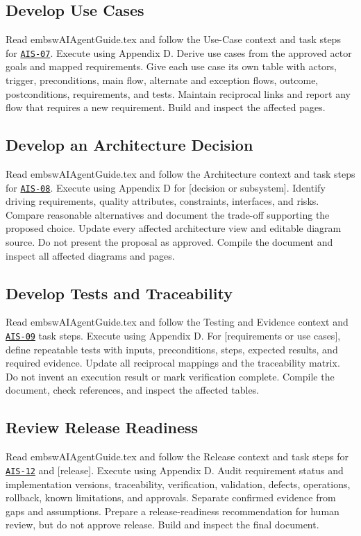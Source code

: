 \subsection{Develop Use Cases}
\begingroup\ttfamily\raggedright
\noindent Read embswAIAgentGuide.tex and follow the Use-Case context and task steps for \hyperref[Skill:AIS-07]{\texttt{AIS-07}}. Execute using Appendix D. Derive use cases from the approved actor goals and mapped requirements. Give each use case its own table with actors, trigger, preconditions, main flow, alternate and exception flows, outcome, postconditions, requirements, and tests. Maintain reciprocal links and report any flow that requires a new requirement. Build and inspect the affected pages.\par
\endgroup


\subsection{Develop an Architecture Decision}
\begingroup\ttfamily\raggedright
\noindent Read embswAIAgentGuide.tex and follow the Architecture context and task steps for \hyperref[Skill:AIS-08]{\texttt{AIS-08}}. Execute using Appendix D for [decision or subsystem]. Identify driving requirements, quality attributes, constraints, interfaces, and risks. Compare reasonable alternatives and document the trade-off supporting the proposed choice. Update every affected architecture view and editable diagram source. Do not present the proposal as approved. Compile the document and inspect all affected diagrams and pages.\par
\endgroup


\subsection{Develop Tests and Traceability}
\begingroup\ttfamily\raggedright
\noindent Read embswAIAgentGuide.tex and follow the Testing and Evidence context and \hyperref[Skill:AIS-09]{\texttt{AIS-09}} task steps. Execute using Appendix D. For [requirements or use cases], define repeatable tests with inputs, preconditions, steps, expected results, and required evidence. Update all reciprocal mappings and the traceability matrix. Do not invent an execution result or mark verification complete. Compile the document, check references, and inspect the affected tables.\par
\endgroup


\subsection{Review Release Readiness}
\begingroup\ttfamily\raggedright
\noindent Read embswAIAgentGuide.tex and follow the Release context and task steps for \hyperref[Skill:AIS-12]{\texttt{AIS-12}} and [release]. Execute using Appendix D. Audit requirement status and implementation versions, traceability, verification, validation, defects, operations, rollback, known limitations, and approvals. Separate confirmed evidence from gaps and assumptions. Prepare a release-readiness recommendation for human review, but do not approve release. Build and inspect the final document.\par
\endgroup


